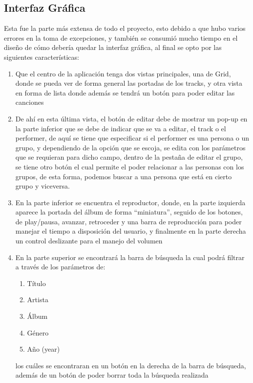 \subsection{Interfaz Gráfica}
Esta fue la parte más extensa de todo el proyecto, esto debido a que hubo varios errores en la toma de excepciones, y también se consumió mucho tiempo en el diseño de cómo debería quedar la interfaz gráfica, al final se opto por las siguientes características: 
\begin{enumerate}
    \item Que el centro de la aplicación tenga dos vistas principales, una de Grid, donde se pueda ver de forma general las portadas de los tracks, y otra vista en forma de lista donde además se tendrá un botón para poder editar las canciones
    \item De ahí en esta última vista, el botón de editar debe de mostrar un pop-up en la parte inferior que se debe de indicar que se va a editar, el track o el performer, de aquí se tiene que especificar si el performer es una persona o un grupo, y dependiendo de la opción que se escoja, se edita con los parámetros que se requieran para dicho campo, dentro de la pestaña de editar el grupo, se tiene otro botón el cual permite el poder relacionar a las personas con los grupos, de esta forma, podemos buscar a una persona que está en cierto grupo y viceversa.
    \item En la parte inferior se encuentra el reproductor, donde, en la parte izquierda aparece la portada del álbum de forma ``miniatura'', seguido de los botones, de play/pausa, avanzar, retroceder y una barra de reproducción para poder manejar el tiempo a disposición del usuario, y finalmente en la parte derecha un control deslizante para el manejo del volumen
    \item En la parte superior se encontrará la barra de búsqueda la cual podrá filtrar a través de los parámetros de: 
    \begin{enumerate}
        \item Título
        \item Artista
        \item Álbum
        \item Género
        \item Año (year)
    \end{enumerate}
    los cuáles se encontraran en un botón en la derecha de la barra de búsqueda, además de un botón de poder borrar toda  la búsqueda realizada
\end{enumerate}

